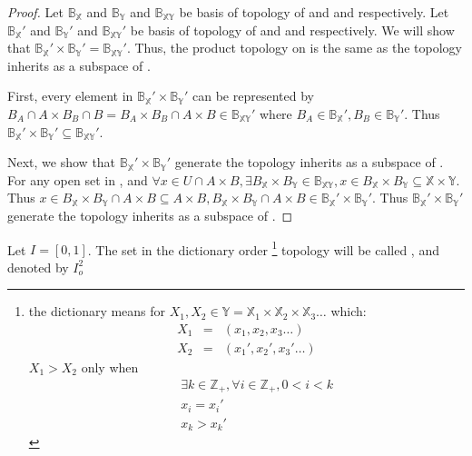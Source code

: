 \begin{proof}
      Let $ \mathbb{B}_{\mathbb{X}} $ and $ \mathbb{B}_{\mathbb{Y}} $ and $ \mathbb{B}_{\mathbb{XY}} $ be basis of topology of  and  and  respectively. Let $ \mathbb{B}_{\mathbb{X}}' $ and $ \mathbb{B}_{\mathbb{Y}}' $ and $ \mathbb{B}_{\mathbb{XY}}' $ be basis of topology of  and  and  respectively. We will show that $ \mathbb{B}_{\mathbb{X}}' \times \mathbb{B}_{\mathbb{Y}}' = \mathbb{B}_{\mathbb{XY}}' $. Thus,  the product topology on  is the same as the topology  inherits as a subspace of .

      First, every element in $ \mathbb{B}_{\mathbb{X}}' \times \mathbb{B}_{\mathbb{Y}}' $ can be represented by $ B_{A} \cap A \times B_{B} \cap B = B_{A} \times B_{B} \cap A \times B \in \mathbb{B}_{\mathbb{XY}}' $ where $ B_{A} \in \mathbb{B}_{\mathbb{X}}', B_{B} \in \mathbb{B}_{\mathbb{Y}}' $. Thus $ \mathbb{B}_{\mathbb{X}}' \times \mathbb{B}_{\mathbb{Y}}' \subseteq \mathbb{B}_{\mathbb{XY}}' $.

      Next, we show that $ \mathbb{B}_{\mathbb{X}}' \times \mathbb{B}_{\mathbb{Y}}' $ generate the topology  inherits as a subspace of . For any open set  in , and $ \forall x \in U \cap A \times B, \exists B_{\mathbb{X}} \times B_{\mathbb{Y}} \in \mathbb{B}_{\mathbb{XY}}, x \in B_{\mathbb{X}} \times B_{\mathbb{Y}} \subseteq \mathbb{X} \times \mathbb{Y} $.
      Thus $ x \in B_{\mathbb{X}} \times B_{\mathbb{Y}} \cap A \times B \subseteq A \times B, B_{\mathbb{X}} \times B_{\mathbb{Y}} \cap A \times B \in \mathbb{B}_{\mathbb{X}}' \times \mathbb{B}_{\mathbb{Y}}' $.
      Thus $ \mathbb{B}_{\mathbb{X}}' \times \mathbb{B}_{\mathbb{Y}}' $ generate the topology  inherits as a subspace of .
\end{proof}

\begin{definition}\label{def:OrderedSquare}
      Let $ I = [0,1] $. The set  in the dictionary order \footnote{
            the dictionary means for $ X_{1}, X_{2} \in \mathbb{Y} = \mathbb{X}_{1} \times \mathbb{X}_{2} \times \mathbb{X}_{3} \dots $ which:
            \begin{eqnarray*}
                  X_{1} &=& (x_{1},x_{2},x_{3}\dots)\\
                  X_{2} &=& (x_{1}',x_{2}',x_{3}'\dots)
            \end{eqnarray*}
            $ X_1 > X_2 $ only when
            \begin{eqnarray*}
                  && \exists k \in \mathbb{Z}_{+}, \forall i \in \mathbb{Z}_{+}, 0 < i < k \\
                  && x_{i} = x_{i}'\\
                  && x_{k} > x_{k}'
            \end{eqnarray*}
      } topology will be called , and denoted by $ I_{o}^{2} $
\end{definition}

